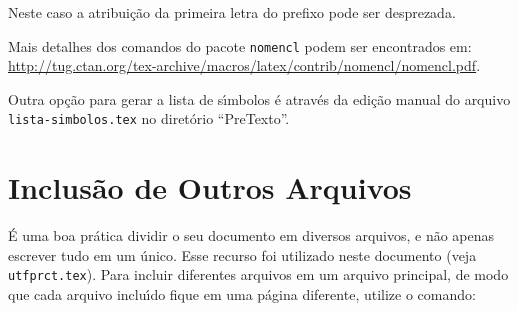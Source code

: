 \noindent Neste caso a atribui\c{c}\~ao da primeira letra do prefixo pode ser desprezada.


Mais detalhes dos comandos do pacote \texttt{nomencl} podem ser encontrados em: \url{http://tug.ctan.org/tex-archive/macros/latex/contrib/nomencl/nomencl.pdf}.

Outra op\c{c}\~ao para gerar a lista de s\'{\i}mbolos \'e atrav\'es da edi\c{c}\~ao manual do arquivo \texttt{lista-simbolos.tex} no diret\'orio ``PreTexto''.

\section{Inclus\~ao de Outros Arquivos}\label{sec:inclusao}

\'E uma boa pr\'atica dividir o seu documento em diversos arquivos, e n\~ao apenas escrever tudo em um \'unico. Esse recurso foi utilizado neste documento (veja \texttt{utfprct.tex}). Para incluir diferentes arquivos em um arquivo principal, de modo que cada arquivo inclu\'{\i}do fique em uma p\'agina diferente, utilize o comando:

